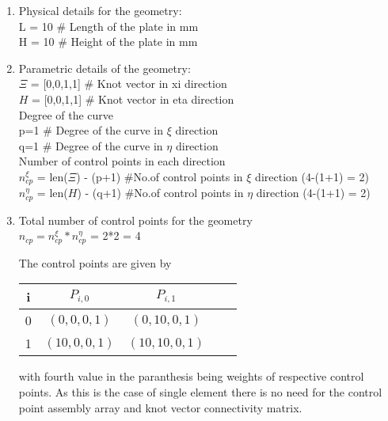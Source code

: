 \documentclass[11pt]{article}
\begin{document}
\begin{enumerate}
	\item Physical details for the geometry: \\
	L = 10 \qquad \# Length of the plate in mm \\
	H = 10 \qquad \# Height of the plate in mm \\
	
	\item Parametric details of the geometry: \\
	$\Xi$ = [0,0,1,1] \qquad \# Knot vector in xi  direction \\
	$H$ = [0,0,1,1] \qquad \# Knot vector in eta direction \\
	
	Degree of the curve \\
	p=1 \qquad \# Degree of the curve in $\xi$  direction \\
	q=1 \qquad \# Degree of the curve in $\eta$ direction \\
	
	Number of control points in each direction \\
	$n_{cp}^{\xi}$  = len($\Xi$) - (p+1)  \qquad \#No.of control points in $\xi$
	direction (4-(1+1) = 2) \\
	$n_{cp}^{\eta}$ = len($H$) - (q+1)  \qquad \#No.of control points in $\eta$
	direction (4-(1+1) = 2) \\
	
	\item Total number of control points for the geometry \\
	$n_{cp} = n_{cp}^{\xi} * n_{cp}^{\eta}$ = 2*2 = 4\\
	\begin{comment}
	\item Control points net for the geometry \\
	P = [[[0,0,0,1],[L,0,0,1]],
	[[0,L,0,1],[L,L,0,1]]]
	
	$$
	P = \begin{bmatrix}
	[0,0,0,1] & [L,0,0,1] \\
	[L,0,0,1] & [L,L,0,1] \\
	\end{bmatrix} 
	$$
	
	\end{enumerate}
	\end{comment}
	The control points are given by
	\begin{center}
		\begin{tabular}{ |c|c|c|c|c| } 
			\hline
			i & $ P_{i,0} $ & $ P_{i,1} $  \\ \hline
			0 & $ (0,0,0,1) $ & $ (0,10,0,1) $  \\ \hline
			1 & $ (10,0,0,1) $ & $ (10,10,0,1) $  \\ \hline
			
		\end{tabular}
	\end{center}
	with fourth value in the paranthesis being weights of respective control points.
	As this is the case of single element there is no need for the control point
	assembly array and knot vector connectivity matrix.
\end{enumerate}
\end{document}
